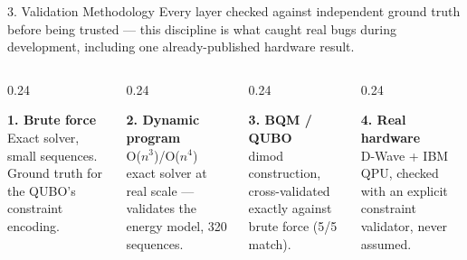 \documentclass[aspectratio=169,10pt]{beamer}
\begin{document}
\begin{frame}{3. Validation Methodology}
  \small Every layer checked against independent ground truth before being trusted --- this discipline is what caught real bugs during development, including one already-published hardware result.
  \vspace{6pt}

  \begin{columns}[T]
    \begin{column}{0.24\textwidth}
      \begin{cardbox}
      \textbf{\small\color{navy}1. Brute force}\\[4pt]
      \tiny Exact solver, small sequences. Ground truth for the QUBO's constraint encoding.
      \end{cardbox}
    \end{column}
    \begin{column}{0.24\textwidth}
      \begin{cardbox}
      \textbf{\small\color{navy}2. Dynamic program}\\[4pt]
      \tiny O($n^3$)/O($n^4$) exact solver at real scale --- validates the energy model, 320 sequences.
      \end{cardbox}
    \end{column}
    \begin{column}{0.24\textwidth}
      \begin{cardbox}
      \textbf{\small\color{navy}3. BQM / QUBO}\\[4pt]
      \tiny dimod construction, cross-validated exactly against brute force (5/5 match).
      \end{cardbox}
    \end{column}
    \begin{column}{0.24\textwidth}
      \begin{cardbox}
      \textbf{\small\color{navy}4. Real hardware}\\[4pt]
      \tiny D-Wave + IBM QPU, checked with an explicit constraint validator, never assumed.
      \end{cardbox}
    \end{column}
  \end{columns}
\end{frame}
\end{document}
